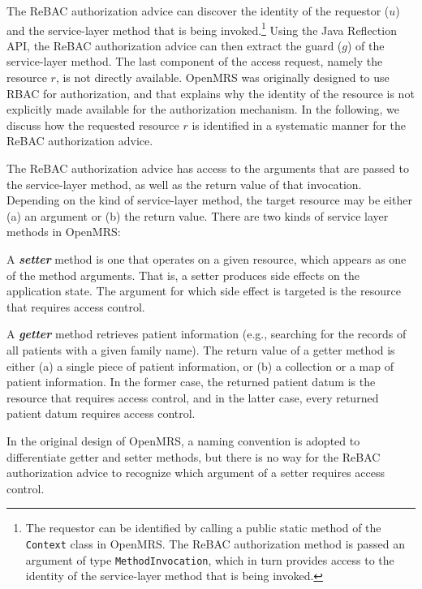 \documentclass{acm_proc_article-sp}
\newcommand{\Dfn}[1]{\textbf{\emph{#1}}}
\newcommand{\textcode}[1]{\texttt{#1}}
\begin{document}
The ReBAC authorization advice can discover the identity of the
requestor ($u$) and the service-layer method that is being
invoked.\footnote{The requestor can be identified by calling a public
  static method of the \textcode{Context} class in OpenMRS.  The ReBAC
  authorization method is passed an argument of type
  \textcode{MethodInvocation}, which in turn provides access to the
  identity of the service-layer method that is being invoked.}  Using
the Java Reflection API, the ReBAC authorization advice can then
extract the guard ($g$) of the service-layer method. The last
component of the access request, namely the resource $r$, is not
directly available. OpenMRS was originally designed to use RBAC for
authorization, and that explains why the identity of the resource is
not explicitly made available for the authorization mechanism.  In the
following, we discuss how the requested resource $r$ is identified in
a systematic manner for the ReBAC authorization advice.

The ReBAC authorization advice has access to the arguments that are
passed to the service-layer method, as well as the return value of
that invocation.  Depending on the kind of service-layer method, the
target resource may be either (a) an argument or (b) the return value.
There are two kinds of service layer methods in OpenMRS:
\begin{compactenum}
\item A \Dfn{setter} method is one that operates on a given resource,
  which appears as one of the method arguments.  That is, a setter
  produces side effects on the application state.  The argument for
  which side effect is targeted is the resource that requires access
  control.
\item A \Dfn{getter} method retrieves patient information (e.g.,
  searching for the records of all patients with a given family name).
  The return value of a getter method is either (a) a single piece of
  patient information, or (b) a collection or a map of patient
  information.  In the former case, the returned patient datum is the
  resource that requires access control, and in the latter case, every
  returned patient datum requires access control.
\end{compactenum}
In the original design of OpenMRS, a naming convention is adopted to
differentiate getter and setter methods, but there is no way for the
ReBAC authorization advice to recognize which argument of a setter
requires access control.
\end{document}

